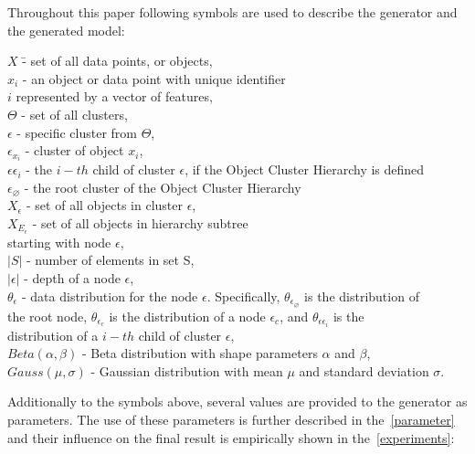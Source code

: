 \documentclass{article}
\begin{document}
    Throughout this paper following symbols are used to describe the generator and the generated model:
\begin{tabbing}
	$X$ \hspace{10mm} \= - set of all data points, or objects, \\
	$x_i$ \> - an object or data point with unique identifier\\ \> $i$ represented by a vector of features, \\
	$\Theta$ \> - set of all clusters, \\
	$\epsilon$ \> - specific cluster from $\Theta$, \\
	$\epsilon_{x_i}$ \> - cluster of object $x_i$, \\
	$\epsilon\epsilon_i$ \> - the $i-th$ child of cluster $\epsilon$, if the Object Cluster Hierarchy is defined\\
	$\epsilon_\varnothing$ \> - the root cluster of the Object Cluster Hierarchy\\
	$X_\epsilon$ \> - set of all objects in cluster $\epsilon$, \\
	$X_{E_\epsilon}$ \> - set of all objects in hierarchy subtree\\ \> starting with node $\epsilon$, \\
	$|S|$ \> - number of elements in set S, \\
	$|\epsilon|$ \> - depth of a node $\epsilon$, \\
	$\theta_\epsilon$ \> - data distribution for the node $\epsilon$. Specifically, $\theta_{\epsilon_\varnothing}$ is the distribution of \\ \> the root node,  $\theta_{\epsilon_c}$ is the distribution of a node $\epsilon_c$, and $\theta_{\epsilon\epsilon_i}$ is the \\ \> distribution of a $i-th$ child of cluster $\epsilon$, \\
	$Beta(\alpha, \beta)$ \; - Beta distribution with shape parameters $\alpha$ and $\beta$, \\
	$Gauss(\mu, \sigma)$ \; - Gaussian distribution with mean $\mu$ and standard deviation $\sigma$.
\end{tabbing}	
	Additionally to the symbols above, several values are provided to the generator as parameters. The use of these parameters is further described in the~\cref{parameter} and their influence on the final result is empirically shown in the~\cref{experiments}:
%
\end{document}
